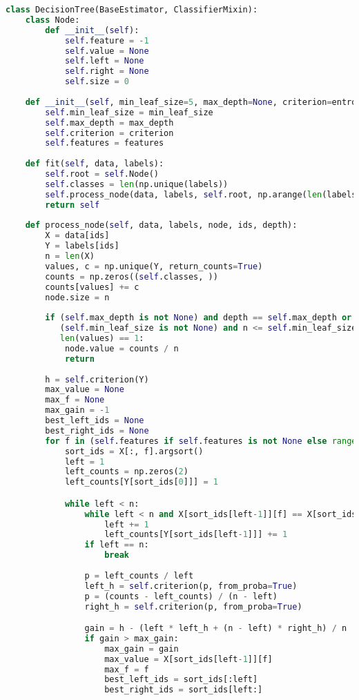 \begin{lstlisting}[language=python, keepspaces=true]
class DecisionTree(BaseEstimator, ClassifierMixin):
    class Node:
        def __init__(self):
            self.feature = -1
            self.value = None
            self.left = None
            self.right = None
            self.size = 0
    
    def __init__(self, min_leaf_size=5, max_depth=None, criterion=entropy, features=None):
        self.min_leaf_size = min_leaf_size
        self.max_depth = max_depth
        self.criterion = criterion
        self.features = features
    
    def fit(self, data, labels):
        self.root = self.Node()
        self.classes = len(np.unique(labels))
        self.process_node(data, labels, self.root, np.arange(len(labels)), 0)
        return self
        
    def process_node(self, data, labels, node, ids, depth):
        X = data[ids]
        Y = labels[ids]
        n = len(X)
        values, c = np.unique(Y, return_counts=True)
        counts = np.zeros((self.classes, ))
        counts[values] += c
        node.size = n
        
        if (self.max_depth is not None) and depth == self.max_depth or \
           (self.min_leaf_size is not None) and n <= self.min_leaf_size or \
           len(values) == 1:
            node.value = counts / n
            return
        
        h = self.criterion(Y)
        max_value = None
        max_f = None
        max_gain = -1
        best_left_ids = None
        best_right_ids = None
        for f in (self.features if self.features is not None else range(data.shape[1])):
            sort_ids = X[:, f].argsort()
            left = 1
            left_counts = np.zeros(2)
            left_counts[Y[sort_ids[0]]] = 1

            while left < n:
                while left < n and X[sort_ids[left-1]][f] == X[sort_ids[left-2]][f]:
                    left += 1
                    left_counts[Y[sort_ids[left-1]]] += 1
                if left == n:
                    break
                    
                p = left_counts / left
                left_h = self.criterion(p, from_proba=True)
                p = (counts - left_counts) / (n - left)
                right_h = self.criterion(p, from_proba=True)

                gain = h - (left * left_h + (n - left) * right_h) / n
                if gain > max_gain:
                    max_gain = gain
                    max_value = X[sort_ids[left-1]][f]
                    max_f = f
                    best_left_ids = sort_ids[:left]
                    best_right_ids = sort_ids[left:]


\end{lstlisting}
